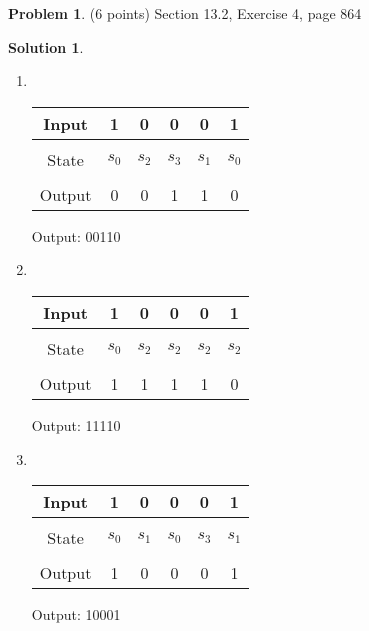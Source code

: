 \documentclass{article}
\theoremstyle{definition}
\newtheorem{problem}{Problem}
\newtheorem*{solution}{Solution}
\begin{document}
\begin{problem} (6 points)
Section 13.2, Exercise 4, page 864
\end{problem}
\begin{solution} \ \\
 \begin{enumerate}
   \item \ \\
   \begin{table}[h]
   \begin{center}
     \begin{tabular}{c|ccccc}
       Input & 1 & 0 & 0 & 0 & 1 \\
       \hline \\
       State & $s_0$ & $s_2$ & $s_3$ & $s_1$ & $s_0$ \\
       \hline \\
       Output & 0 & 0 & 1 & 1 & 0
     \end{tabular}
   \end{center}
   Output: 00110
 \end{table}
 
   \item \ \\
   \begin{table}[h]
   \begin{center}
     \begin{tabular}{c|ccccc}
       Input & 1 & 0 & 0 & 0 & 1\\
       \hline \\
       State & $s_0$ & $s_2$ & $s_2$ & $s_2$ & $s_2$ \\
       \hline \\
       Output & 1 & 1 & 1 & 1 & 0
     \end{tabular}
   \end{center}
   Output: 11110
 \end{table}
 
   \item \ \\
   \begin{table}[h]
   \begin{center}
     \begin{tabular}{c|ccccc}
       Input & 1 & 0 & 0 & 0 & 1 \\
       \hline \\
       State & $s_0$ & $s_1$ & $s_0$ & $s_3$ & $s_1$ \\
       \hline \\
       Output & 1 & 0 & 0 & 0 & 1
     \end{tabular}
   \end{center}
   Output: 10001
 \end{table}
 
 \end{enumerate}
\end{solution}
\end{document}
